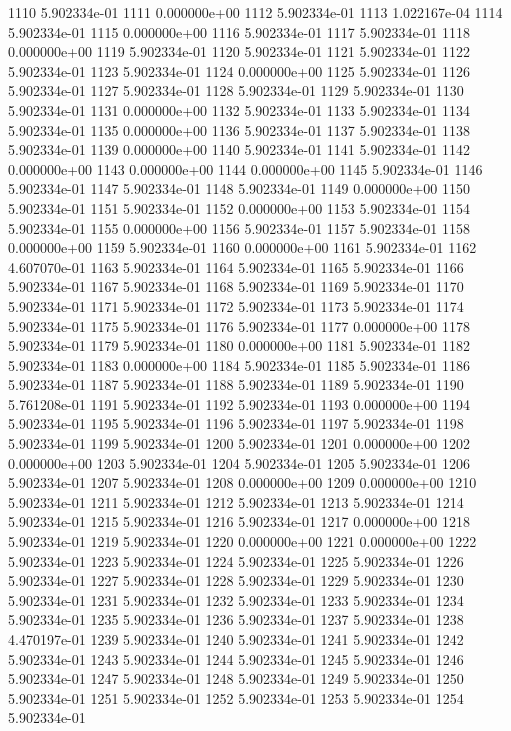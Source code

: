 \documentclass{article}
\begin{document}
\begin{Schunk}
\begin{Soutput}
1110 5.902334e-01
1111 0.000000e+00
1112 5.902334e-01
1113 1.022167e-04
1114 5.902334e-01
1115 0.000000e+00
1116 5.902334e-01
1117 5.902334e-01
1118 0.000000e+00
1119 5.902334e-01
1120 5.902334e-01
1121 5.902334e-01
1122 5.902334e-01
1123 5.902334e-01
1124 0.000000e+00
1125 5.902334e-01
1126 5.902334e-01
1127 5.902334e-01
1128 5.902334e-01
1129 5.902334e-01
1130 5.902334e-01
1131 0.000000e+00
1132 5.902334e-01
1133 5.902334e-01
1134 5.902334e-01
1135 0.000000e+00
1136 5.902334e-01
1137 5.902334e-01
1138 5.902334e-01
1139 0.000000e+00
1140 5.902334e-01
1141 5.902334e-01
1142 0.000000e+00
1143 0.000000e+00
1144 0.000000e+00
1145 5.902334e-01
1146 5.902334e-01
1147 5.902334e-01
1148 5.902334e-01
1149 0.000000e+00
1150 5.902334e-01
1151 5.902334e-01
1152 0.000000e+00
1153 5.902334e-01
1154 5.902334e-01
1155 0.000000e+00
1156 5.902334e-01
1157 5.902334e-01
1158 0.000000e+00
1159 5.902334e-01
1160 0.000000e+00
1161 5.902334e-01
1162 4.607070e-01
1163 5.902334e-01
1164 5.902334e-01
1165 5.902334e-01
1166 5.902334e-01
1167 5.902334e-01
1168 5.902334e-01
1169 5.902334e-01
1170 5.902334e-01
1171 5.902334e-01
1172 5.902334e-01
1173 5.902334e-01
1174 5.902334e-01
1175 5.902334e-01
1176 5.902334e-01
1177 0.000000e+00
1178 5.902334e-01
1179 5.902334e-01
1180 0.000000e+00
1181 5.902334e-01
1182 5.902334e-01
1183 0.000000e+00
1184 5.902334e-01
1185 5.902334e-01
1186 5.902334e-01
1187 5.902334e-01
1188 5.902334e-01
1189 5.902334e-01
1190 5.761208e-01
1191 5.902334e-01
1192 5.902334e-01
1193 0.000000e+00
1194 5.902334e-01
1195 5.902334e-01
1196 5.902334e-01
1197 5.902334e-01
1198 5.902334e-01
1199 5.902334e-01
1200 5.902334e-01
1201 0.000000e+00
1202 0.000000e+00
1203 5.902334e-01
1204 5.902334e-01
1205 5.902334e-01
1206 5.902334e-01
1207 5.902334e-01
1208 0.000000e+00
1209 0.000000e+00
1210 5.902334e-01
1211 5.902334e-01
1212 5.902334e-01
1213 5.902334e-01
1214 5.902334e-01
1215 5.902334e-01
1216 5.902334e-01
1217 0.000000e+00
1218 5.902334e-01
1219 5.902334e-01
1220 0.000000e+00
1221 0.000000e+00
1222 5.902334e-01
1223 5.902334e-01
1224 5.902334e-01
1225 5.902334e-01
1226 5.902334e-01
1227 5.902334e-01
1228 5.902334e-01
1229 5.902334e-01
1230 5.902334e-01
1231 5.902334e-01
1232 5.902334e-01
1233 5.902334e-01
1234 5.902334e-01
1235 5.902334e-01
1236 5.902334e-01
1237 5.902334e-01
1238 4.470197e-01
1239 5.902334e-01
1240 5.902334e-01
1241 5.902334e-01
1242 5.902334e-01
1243 5.902334e-01
1244 5.902334e-01
1245 5.902334e-01
1246 5.902334e-01
1247 5.902334e-01
1248 5.902334e-01
1249 5.902334e-01
1250 5.902334e-01
1251 5.902334e-01
1252 5.902334e-01
1253 5.902334e-01
1254 5.902334e-01

\end{Soutput}
\end{Schunk}
\end{document}

